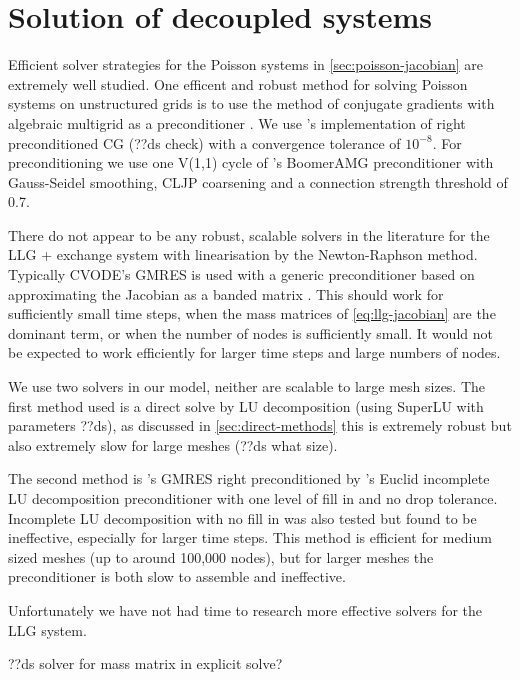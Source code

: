 \section{Solution of decoupled systems}
\label{sec:llg-only-system}

Efficient solver strategies for the Poisson systems in \cref{sec:poisson-jacobian} are extremely well studied.
One efficent and robust method for solving Poisson systems on unstructured grids is to use the method of conjugate gradients with algebraic multigrid as a preconditioner \cite[Chap. 2]{HowardElmanDavidSilvester2006}.
We use \oomph's implementation of right preconditioned CG (??ds check) with a convergence tolerance of $10^{-8}$.
For preconditioning we use one V(1,1) cycle of \hypre's BoomerAMG preconditioner \cite{hypre} with Gauss-Seidel smoothing, CLJP coarsening and a connection strength threshold of 0.7.


There do not appear to be any robust, scalable solvers in the literature for the LLG + exchange system with linearisation by the Newton-Raphson method.
Typically CVODE's GMRES is used with a generic preconditioner based on approximating the Jacobian as a banded matrix \cite{nmag} \cite{Vasslios}.
This should work for sufficiently small time steps, \ie when the mass matrices of \cref{eq:llg-jacobian} are the dominant term, or when the number of nodes is sufficiently small.
It would not be expected to work efficiently for larger time steps and large numbers of nodes.

We use two solvers in our model, neither are scalable to large mesh sizes.
The first method used is a direct solve by LU decomposition (using SuperLU \cite{superlu} with parameters ??ds), as discussed in \cref{sec:direct-methods} this is extremely robust but also extremely slow for large meshes (??ds what size).

The second method is \oomph's GMRES right preconditioned by \hypre's Euclid incomplete LU decomposition preconditioner with one level of fill in and no drop tolerance.
Incomplete LU decomposition with no fill in was also tested but found to be ineffective, especially for larger time steps.
This method is efficient for medium sized meshes (up to around 100,000 nodes), but for larger meshes the preconditioner is both slow to assemble and ineffective.

Unfortunately we have not had time to research more effective solvers for the LLG system.


??ds solver for mass matrix in explicit solve?


